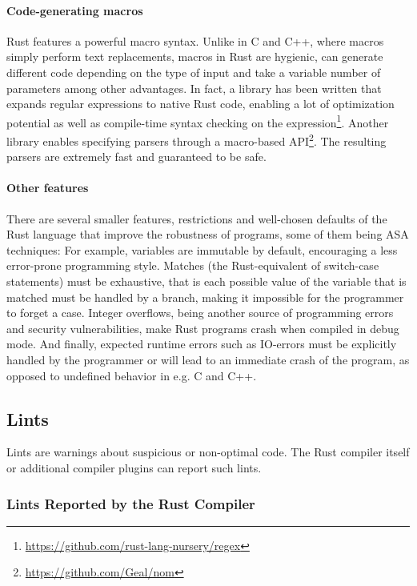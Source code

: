 \documentclass{scrartcl}
\begin{document}
\paragraph{Code-generating macros} Rust features a powerful macro syntax. Unlike in C and C++, where macros simply perform text replacements, macros in Rust are hygienic, can generate different code depending on the type of input and take a variable number of parameters among other advantages. In fact, a library has been written that expands regular expressions to native Rust code, enabling a lot of optimization potential as well as compile-time syntax checking on the expression\footnote{\url{https://github.com/rust-lang-nursery/regex}}. Another library enables specifying parsers through a macro-based API\footnote{\url{https://github.com/Geal/nom}}. The resulting parsers are extremely fast and guaranteed to be safe.

\paragraph{Other features} There are several smaller features, restrictions and well-chosen defaults of the Rust language that improve the robustness of programs, some of them being ASA techniques: For example, variables are immutable by default, encouraging a less error-prone programming style. Matches (the Rust-equivalent of switch-case statements) must be exhaustive, that is each possible value of the variable that is matched must be handled by a branch, making it impossible for the programmer to forget a case. Integer overflows, being another source of programming errors and security vulnerabilities, make Rust programs crash when compiled in debug mode. And finally, expected runtime errors such as IO-errors must be explicitly handled by the programmer or will lead to an immediate crash of the program, as opposed to undefined behavior in e.g. C and C++.


\subsection{Lints}

Lints are warnings about suspicious or non-optimal code. The Rust compiler itself or additional compiler plugins can report such lints.

\subsubsection{Lints Reported by the Rust Compiler}
\end{document}
